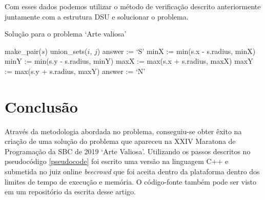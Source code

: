 \documentclass[12pt]{article}
\begin{document}
Com esses dados podemos utilizar o método de verificação descrito anteriormente juntamente com a estrutura DSU e solucionar o problema.

\begin{algorithm}[ht]
    \caption{Solução para o problema `Arte valiosa'}
    \label{pseudocode}
    \begin{algorithmic}[1]
           \STATE make\_pair($s$)
       \ENDFOR
                        \STATE union\_sets($i$, $j$)
                    \ENDIF
                \ENDIF
            \ENDFOR
       \ENDFOR
       \STATE answer := `S'
               \STATE minX := min(s.x - s.radius, minX)
               \STATE minY := min(s.y - s.radius, minY)
               \STATE maxX := max(s.x + s.radius, maxX)
               \STATE maxY := max(s.y + s.radius, maxY)
           \ENDFOR
            \STATE answer := `N'
           \ENDIF
       \ENDFOR
    \end{algorithmic}
\end{algorithm}

\section{Conclusão}
Através da metodologia abordada no problema, conseguiu-se obter êxito na criação de uma solução do problema que apareceu na XXIV Maratona de Programação da SBC de 2019 `Arte Valiosa'. Utilizando os passos descritos no pseudocódigo \ref{pseudocode} foi escrito uma versão na linguagem C++ e submetida no juiz online \textit{beecrowd} que foi aceita dentro da plataforma dentro dos limites de tempo de execução e memória. O código-fonte também pode ser visto em um \hypertarget{https://github.com/alequisk/semana-universitaria}{repositório} da escrita desse artigo.



\end{document}
